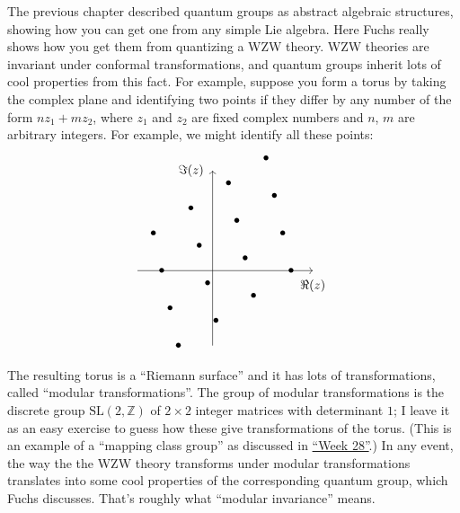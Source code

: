 \documentclass{article}
\begin{document}
\begin{enumerate}
  The previous chapter described quantum groups as abstract algebraic
  structures, showing how you can get one from any simple Lie algebra.
  Here Fuchs really shows how you get them from quantizing a WZW theory.
  WZW theories are invariant under conformal transformations, and
  quantum groups inherit lots of cool properties from this fact. For
  example, suppose you form a torus by taking the complex plane and
  identifying two points if they differ by any number of the form
  \(n z_1 + m z_2\), where \(z_1\) and \(z_2\) are fixed complex numbers
  and \(n\), \(m\) are arbitrary integers. For example, we might
  identify all these points: \[
     \begin{tikzpicture}[scale=0.7]
       \draw[->] (-3,0) to (4,0) node[label=below:{$\Re(z)$}]{};
       \draw[->] (0,-3) to (0,4) node[label=left:{$\Im(z)$}]{};
       \foreach \m in {-1,0,1,2}
       {
         \foreach \n in {-1,0,1,2}
         {
           \node at ({\m*1.5-\n/3-0.2},{1.5*\n+\m-0.5}) {$\bullet$};
         }
       }
     \end{tikzpicture}
   \] The resulting torus is a ``Riemann surface'' and it has lots of
  transformations, called ``modular transformations''. The group of
  modular transformations is the discrete group
  \(\mathrm{SL}(2,\mathbb{Z})\) of \(2\times2\) integer matrices with
  determinant \(1\); I leave it as an easy exercise to guess how these
  give transformations of the torus. (This is an example of a ``mapping
  class group'' as discussed in \protect\hyperlink{week28}{``Week
  28''}.) In any event, the way the the WZW theory transforms under
  modular transformations translates into some cool properties of the
  corresponding quantum group, which Fuchs discusses. That's roughly
  what ``modular invariance'' means.


\end{enumerate}
\end{document}
